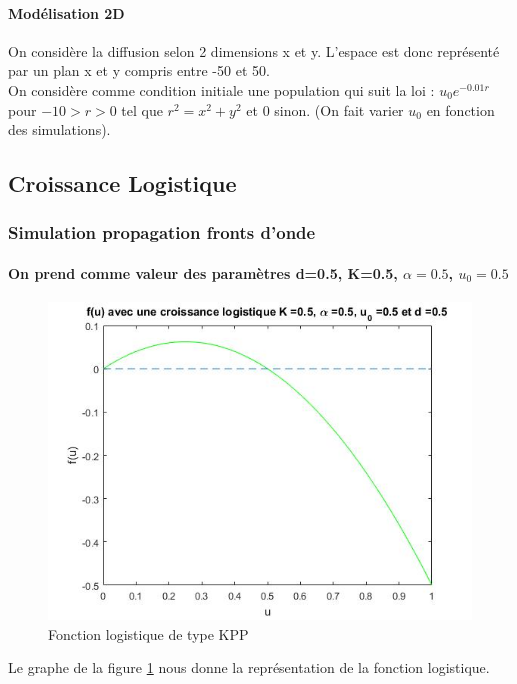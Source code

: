 \documentclass[a4paper,11pt]{article}
\begin{document}
\paragraph{Modélisation 2D}
On considère la diffusion selon 2 dimensions x et y. L'espace est donc représenté par un plan x et y compris entre -50 et 50.\\
On considère comme condition initiale une population qui suit la loi : $u_0 e^{-0.01 r}$ pour $-10 >r>0$ tel que $r^2=x^2+y^2$ et 0 sinon. (On fait varier $u_0$ en fonction des simulations).



\subsection{Croissance Logistique}
\subsubsection{Simulation propagation fronts d'onde}
\paragraph{On prend comme valeur des paramètres d=0.5, K=0.5, $\alpha =0.5$, $u_0=0.5$}
\noindent
\begin{figure}[H]
	\centering
	\includegraphics[width=0.45\linewidth]{SimulationKPP/figures1/fu}\hfill
	\caption{Fonction logistique de type KPP}
	\label{fu}
\end{figure}
\noindent
Le graphe de la figure \ref{fu} nous donne la représentation de la fonction logistique. 
\end{document}
